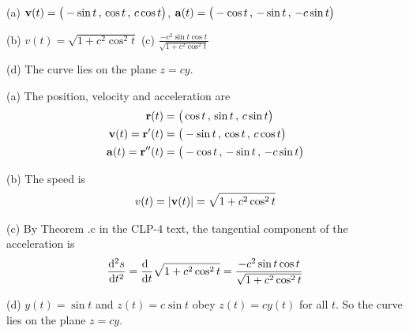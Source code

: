 \begin{answer} 
	(a) $\mathbf{v}(t) = \big(-\sin t\,,\, \cos t\,,\, c \cos t\big)$, 
	$\mathbf{a}(t) = \big(-\cos t\,,\, -\sin t\,,\, -c \sin t\big)$
	
	(b) $v(t) = \sqrt{1+c^2\cos^2 t}$\qquad
	(c) $\frac{-c^2\sin t\cos t}{\sqrt{1+c^2\cos^2 t}}$
	
	(d) The curve lies on the plane $z=cy$.
\end{answer}

\begin{solution} 
	(a) The position, velocity and acceleration are
	\begin{align*}
	\mathbf{r}(t) &= \big(\cos t\,,\, \sin t\,,\, c \sin t\big) \\
	\mathbf{v}(t) =\mathbf{r}'(t) &= \big(-\sin t\,,\, \cos t\,,\, c \cos t\big) \\
	\mathbf{a}(t) =\mathbf{r}''(t)&= \big(-\cos t\,,\, -\sin t\,,\, -c \sin t\big) 
	\end{align*}
	
	(b) The speed is
	\begin{align*}
	v(t) = |\mathbf{v}(t)| = \sqrt{1+c^2\cos^2 t}
	\end{align*}
	
	(c) By Theorem .c in the CLP-4 text,
	the tangential component of the acceleration is
	\begin{align*}
	\difftwo{s}{t} = \diff{\hfill}{t} \sqrt{1+c^2\cos^2 t}
	= \frac{-c^2\sin t\cos t}{\sqrt{1+c^2\cos^2 t}}
	\end{align*}
	
	(d) $y(t) =\sin t$ and $z(t) = c\sin t$ obey
	$z(t) = cy(t)$ for all $t$. So the curve lies on the  plane $z=cy$.
\end{solution}

